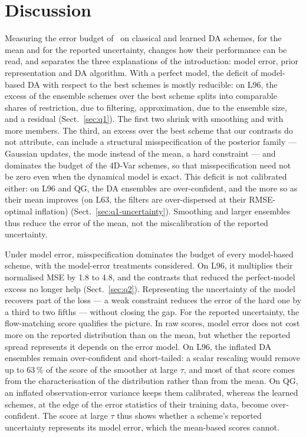 \section{Discussion}\label{sec:discussion}

Measuring the error budget of~\cite{fablet_not_2026} on classical and learned DA schemes, for
the mean and for the reported uncertainty, changes how their performance can be read, and
separates the three explanations of the introduction: model error, prior representation and
DA algorithm. With a perfect
model, the deficit of model-based DA with respect to the best schemes is mostly reducible:
on L96, the excess of the ensemble schemes over the best scheme splits into comparable shares
of restriction, due to filtering, approximation, due to the ensemble size, and a residual
(Sect.~\ref{sec:q1}). The first two shrink with smoothing and with more members. The third, an
excess over the best scheme that our contrasts do not attribute, can include a structural
misspecification of the posterior family --- Gaussian updates, the mode instead of the mean, a hard
constraint --- and dominates the budget of the 4D-Var schemes, so that misspecification need not
be zero even when the dynamical model is exact. This deficit is not calibrated either: on L96 and
QG, the DA ensembles are over-confident, and the more so as their mean improves (on L63, the
filters are over-dispersed at their RMSE-optimal inflation)
(Sect.~\ref{sec:q1-uncertainty}). Smoothing and larger ensembles thus reduce the error of the
mean, not the miscalibration of the reported uncertainty.

Under model error, misspecification dominates the budget of every model-based scheme, with the
model-error treatments considered. On L96, it multiplies their normalised MSE by 1.8 to 4.8, and the contrasts that reduced the perfect-model
excess no longer help (Sect.~\ref{sec:q2}). Representing the uncertainty of the model recovers
part of the loss --- a weak constraint reduces the error of the hard one by a third to two
fifths --- without closing the gap. For the reported uncertainty, the flow-matching score
qualifies the picture. In raw scores, model error does not cost more on the reported
distribution than on the mean, but whether the reported spread represents it depends on the
error model. On L96, the inflated DA ensembles remain over-confident and short-tailed: a scalar
rescaling would remove up to 63\,\% of the score of the smoother at large $\tau$, and most of
that score comes from the characterisation of the distribution rather than from the mean. On
QG, an inflated observation-error variance keeps them calibrated, whereas the learned schemes,
at the edge of the error statistics of their training data, become over-confident. The score at large $\tau$ thus shows whether a scheme's reported
uncertainty represents its model error, which the mean-based scores cannot.

